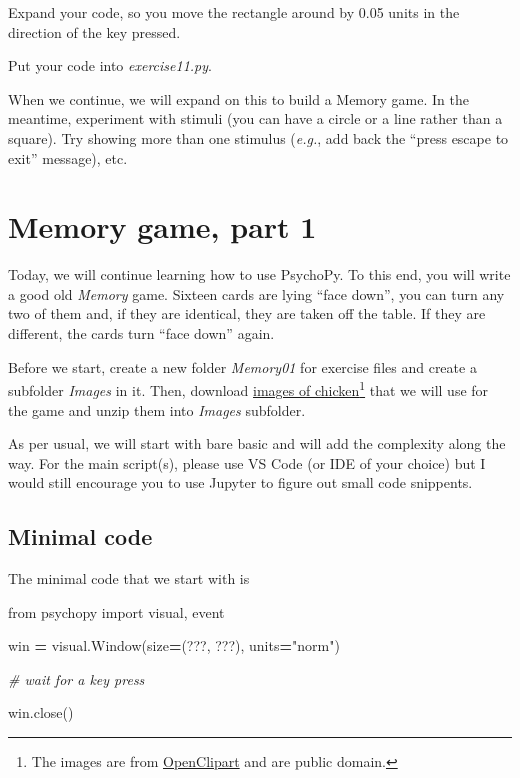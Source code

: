\documentclass[
]{book}
\newenvironment{Shaded}{\begin{snugshade}}{\end{snugshade}}
\newcommand{\CommentTok}[1]{\textcolor[rgb]{0.56,0.35,0.01}{\textit{#1}}}
\newcommand{\ImportTok}[1]{#1}
\newcommand{\NormalTok}[1]{#1}
\newcommand{\OperatorTok}[1]{\textcolor[rgb]{0.81,0.36,0.00}{\textbf{#1}}}
\newcommand{\StringTok}[1]{\textcolor[rgb]{0.31,0.60,0.02}{#1}}
\begin{document}
Expand your code, so you move the rectangle around by 0.05 units in the direction of the key pressed.

Put your code into \emph{exercise11.py}.

When we continue, we will expand on this to build a Memory game. In the meantime, experiment with stimuli (you can have a circle or a line rather than a square). Try showing more than one stimulus (\emph{e.g.}, add back the ``press escape to exit'' message), etc.

\hypertarget{seminar09}{%
\chapter{Memory game, part 1}\label{seminar09}}

Today, we will continue learning how to use PsychoPy. To this end, you will write a good old \emph{Memory} game. Sixteen cards are lying ``face down'', you can turn any two of them and, if they are identical, they are taken off the table. If they are different, the cards turn ``face down'' again.

Before we start, create a new folder \emph{Memory01} for exercise files and create a subfolder \emph{Images} in it. Then, download \href{material/chicken.zip}{images of chicken}\footnote{The images are from \href{https://openclipart.org/}{OpenClipart} and are public domain.} that we will use for the game and unzip them into \emph{Images} subfolder.

As per usual, we will start with bare basic and will add the complexity along the way. For the main script(s), please use VS Code (or IDE of your choice) but I would still encourage you to use Jupyter to figure out small code snippents.

\hypertarget{minimal-code}{%
\section{Minimal code}\label{minimal-code}}

The minimal code that we start with is

\begin{Shaded}
\begin{Highlighting}[]
\ImportTok{from}\NormalTok{ psychopy }\ImportTok{import}\NormalTok{ visual, event}
 
\NormalTok{win }\OperatorTok{=}\NormalTok{ visual.Window(size}\OperatorTok{=}\NormalTok{(???, ???), units}\OperatorTok{=}\StringTok{"norm"}\NormalTok{)}

\CommentTok{\# wait for a key press}

\NormalTok{win.close()}
\end{Highlighting}
\end{Shaded}
\end{document}
